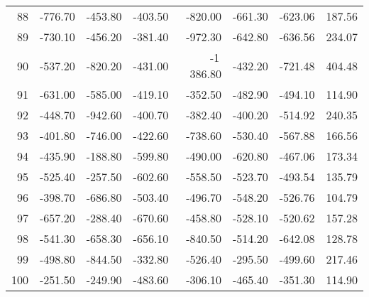 \begin{longtable}{rrrrrrrr}
88 & -776.70 & -453.80 & -403.50 & -820.00 & -661.30 & -623.06 & 187.56  \\
89 & -730.10 & -456.20 & -381.40 & -972.30 & -642.80 & -636.56 & 234.07  \\
90 & -537.20 & -820.20 & -431.00 & -1\,386.80 & -432.20 & -721.48 & 404.48  \\
91 & -631.00 & -585.00 & -419.10 & -352.50 & -482.90 & -494.10 & 114.90  \\
92 & -448.70 & -942.60 & -400.70 & -382.40 & -400.20 & -514.92 & 240.35  \\
93 & -401.80 & -746.00 & -422.60 & -738.60 & -530.40 & -567.88 & 166.56  \\
94 & -435.90 & -188.80 & -599.80 & -490.00 & -620.80 & -467.06 & 173.34  \\
95 & -525.40 & -257.50 & -602.60 & -558.50 & -523.70 & -493.54 & 135.79  \\
96 & -398.70 & -686.80 & -503.40 & -496.70 & -548.20 & -526.76 & 104.79  \\
97 & -657.20 & -288.40 & -670.60 & -458.80 & -528.10 & -520.62 & 157.28  \\
98 & -541.30 & -658.30 & -656.10 & -840.50 & -514.20 & -642.08 & 128.78  \\
99 & -498.80 & -844.50 & -332.80 & -526.40 & -295.50 & -499.60 & 217.46  \\
100 & -251.50 & -249.90 & -483.60 & -306.10 & -465.40 & -351.30 & 114.90  \\

\end{longtable}


